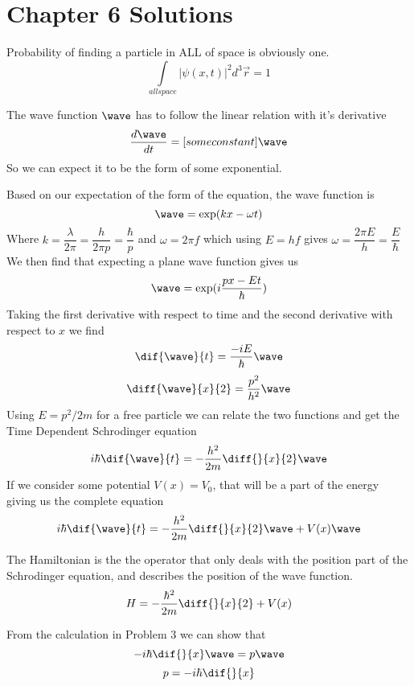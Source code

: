 \section{Chapter 6 Solutions}
	\begin{ans}
	Probability of finding a particle in ALL of space is obviously one. 
	\[ \int\limits_{all space} | \psi(x,t) | ^2 d^3\vec{r}= 1 \]
\end{ans}
\begin{ans}
	The wave function $ \wave $ has to follow the linear relation with it's derivative
	\[ \frac{d \wave}{dt} = [some constant] \wave \]
	So we can expect it to be the form of some exponential. 
\end{ans}
\begin{ans}
	Based on our expectation of the form of the equation, the wave function is
	\[ \wave = \exp(kx - \omega t) \]
	Where $ k = \dfrac{\lambda}{2 \pi} = \dfrac{h}{2 \pi p} = \dfrac{\hbar}{p}$ and $ \omega = 2 \pi f $ which using $ E = hf $ gives $ \omega = \dfrac{2 \pi E}{h} = \dfrac{E}{\hbar} $
	We then find that expecting a plane wave function gives us 
	\[ \wave = \exp(i\frac{px-Et}{\hbar}) \]
	Taking the first derivative with respect to time and the second derivative with respect to $ x $ we find
	\[ \dif{\wave}{t} =  \frac{-iE}{\hbar} \wave\]
	\[ \diff{\wave}{x}{2} = \frac{p^2}{h^2} \wave\]
	Using $ E = p^2/2m $ for a free particle we can relate the two functions and get the Time Dependent Schrodinger equation
	\[ i\hbar \dif{\wave}{t} = -\frac{h^2}{2m} \diff{}{x}{2} \wave \]
	If we consider some potential $ V(x) = V_0 $, that will be a part of the energy giving us the complete equation
	\[ i\hbar \dif{\wave}{t} = -\frac{h^2}{2m} \diff{}{x}{2} \wave + V(x)\wave\]
\end{ans}
\begin{ans}
	The Hamiltonian is the the operator that only deals with the position part of the Schrodinger equation, and describes the position of the wave function. 
	$$ H = -\frac{\hbar^2}{2m} \diff{}{x}{2}  + V(x) $$
\end{ans}
\begin{ans}
	From the calculation in Problem 3 we can show that
	\[ -i \hbar \dif{}{x} \wave = p \wave \]
	\[ p = -i\hbar \dif{}{x} \]
\end{ans}
